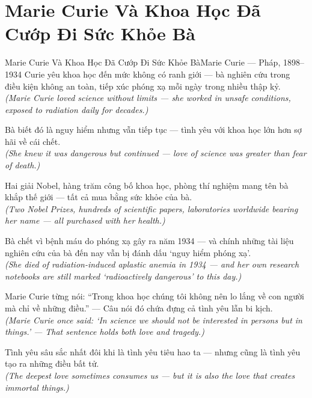 \section{Marie Curie Và Khoa Học Đã Cướp Đi Sức Khỏe Bà}
\begin{truyen}{Marie Curie Và Khoa Học Đã Cướp Đi Sức Khỏe Bà}{Marie Curie --- Pháp, 1898--1934}
 Curie yêu khoa học đến mức không có ranh giới --- bà nghiên cứu trong điều kiện không an toàn, tiếp xúc phóng xạ mỗi ngày trong nhiều thập kỷ.\\[4pt]
\textit{(Marie Curie loved science without limits --- she worked in unsafe conditions, exposed to radiation daily for decades.)}

Bà biết đó là nguy hiểm nhưng vẫn tiếp tục --- tình yêu với khoa học lớn hơn sợ hãi về cái chết.\\[4pt]
\textit{(She knew it was dangerous but continued --- love of science was greater than fear of death.)}

Hai giải Nobel, hàng trăm công bố khoa học, phòng thí nghiệm mang tên bà khắp thế giới --- tất cả mua bằng sức khỏe của bà.\\[4pt]
\textit{(Two Nobel Prizes, hundreds of scientific papers, laboratories worldwide bearing her name --- all purchased with her health.)}

Bà chết vì bệnh máu do phóng xạ gây ra năm 1934 --- và chính những tài liệu nghiên cứu của bà đến nay vẫn bị đánh dấu `nguy hiểm phóng xạ'.\\[4pt]
\textit{(She died of radiation-induced aplastic anemia in 1934 --- and her own research notebooks are still marked `radioactively dangerous' to this day.)}

Marie Curie từng nói: ``Trong khoa học chúng tôi không nên lo lắng về con người mà chỉ về những điều.'' --- Câu nói đó chứa đựng cả tình yêu lẫn bi kịch.\\[4pt]
\textit{(Marie Curie once said: `In science we should not be interested in persons but in things.' --- That sentence holds both love and tragedy.)}

\end{truyen}
\begin{baihoc}
  Tình yêu sâu sắc nhất đôi khi là tình yêu tiêu hao ta --- nhưng cũng là tình yêu tạo ra những điều bất tử.\\[4pt]
  \textit{(The deepest love sometimes consumes us --- but it is also the love that creates immortal things.)}
\end{baihoc}

